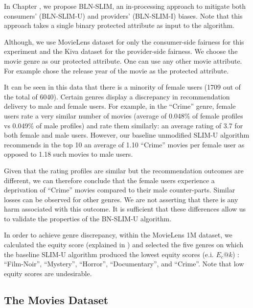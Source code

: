         In Chapter , we propose BLN-SLIM, an in-processing approach to mitigate both consumers' (BLN-SLIM-U) and providers' (BLN-SLIM-I) biases. Note that this approach takes a single binary protected attribute as input to the algorithm.
        
        Although, we use MovieLens dataset for only the consumer-side fairness for this experiment and the Kiva dataset for the provider-side fairness. We choose the movie genre as our protected attribute. One can use any other movie attribute. For example \cite{kamishima2018recommendation} chose the release year of the movie as the protected attribute.
        
        It can be seen in this data that there is a minority of female users (1709 out of the total of 6040). Certain genres display a discrepancy in recommendation delivery to male and female users. For example, in the ``Crime'' genre, female users rate a very similar number of movies (average of 0.048\% of female profiles vs 0.049\% of male profiles) and rate them similarly: an average rating of 3.7 for both female and male users. However, our baseline unmodified SLIM-U algorithm recommends in the top 10 an average of 1.10 ``Crime'' movies per female user as opposed to 1.18 such movies to male users. 
        
        Given that the rating profiles are similar but the recommendation outcomes are different, we can therefore conclude that the female users experience a deprivation of ``Crime'' movies compared to their male counter-parts. Similar losses can be observed for other genres. We are not asserting that there is any harm associated with this outcome. It is sufficient that these differences allow us to validate the properties of the BN-SLIM-U algorithm.
        
        In order to achieve genre discrepancy, within the MovieLens 1M dataset, we calculated the equity score (explained in ) and selected the five genres on which the baseline SLIM-U algorithm produced the lowest equity scores (e.i. $E_c@k$) : ``Film-Noir'', ``Mystery'', ``Horror'', ``Documentary'', and ``Crime''. Note that low equity scores are undesirable.
        



    \subsection{The Movies Dataset}
    
